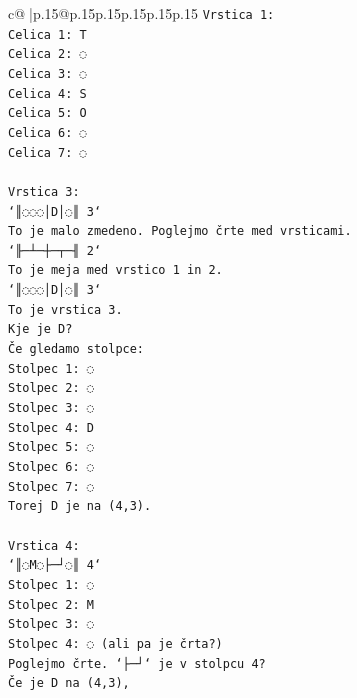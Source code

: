 \documentclass{article}
\begin{document}
{\begin{supertabular}{c@{$\;$}|p{.15\linewidth}@{}p{.15\linewidth}p{.15\linewidth}p{.15\linewidth}p{.15\linewidth}p{.15\linewidth}}
{{{\texttt{Vrstica 1:} \\
\texttt{Celica 1: T} \\
\texttt{Celica 2: ◌} \\
\texttt{Celica 3: ◌} \\
\texttt{Celica 4: S} \\
\texttt{Celica 5: O} \\
\texttt{Celica 6: ◌} \\
\texttt{Celica 7: ◌} \\
\\ 
\texttt{Vrstica 3:} \\
\texttt{`║◌◌◌│D│◌║ 3`} \\
\texttt{To je malo zmedeno. Poglejmo črte med vrsticami.} \\
\texttt{`╟─┴─┼─┬─╢ 2`} \\
\texttt{To je meja med vrstico 1 in 2.} \\
\texttt{`║◌◌◌│D│◌║ 3`} \\
\texttt{To je vrstica 3.} \\
\texttt{Kje je D?} \\
\texttt{Če gledamo stolpce:} \\
\texttt{Stolpec 1: ◌} \\
\texttt{Stolpec 2: ◌} \\
\texttt{Stolpec 3: ◌} \\
\texttt{Stolpec 4: D} \\
\texttt{Stolpec 5: ◌} \\
\texttt{Stolpec 6: ◌} \\
\texttt{Stolpec 7: ◌} \\
\texttt{Torej D je na (4,3).} \\
\\ 
\texttt{Vrstica 4:} \\
\texttt{`║◌M◌├─┘◌║ 4`} \\
\texttt{Stolpec 1: ◌} \\
\texttt{Stolpec 2: M} \\
\texttt{Stolpec 3: ◌} \\
\texttt{Stolpec 4: ◌ (ali pa je črta?)} \\
\texttt{Poglejmo črte. `├─┘` je v stolpcu 4?} \\
\texttt{Če je D na (4,3),} \\
            }
        }
    }
     \\ \\


\end{supertabular}}
\end{document}

